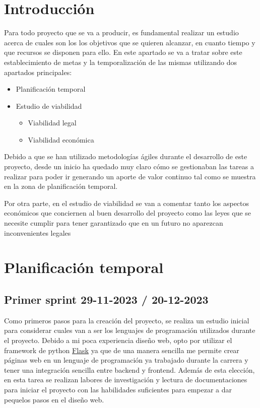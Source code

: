 
\section{Introducción}

Para todo proyecto que se va a producir, es fundamental realizar un estudio acerca de cuales son los los objetivos que se quieren alcanzar, en cuanto tiempo y que recursos se disponen para ello.
En este apartado se va a tratar sobre este establecimiento de metas y la temporalización de las mismas utilizando dos apartados principales:
\begin{itemize}
    \item Planificación temporal
    \item Estudio de viabilidad
    \begin{itemize}
        \item Viabilidad legal
        \item Viabilidad económica

    \end{itemize}

\end{itemize}


Debido a que se han utilizado metodologías ágiles durante el desarrollo de este proyecto, desde un inicio ha quedado muy claro cómo se gestionaban las tareas a realizar para poder ir generando un aporte de valor continuo tal como se muestra en la zona de planificación temporal.

Por otra parte, en el estudio de viabilidad se van a comentar tanto los aspectos económicos que conciernen al buen desarrollo del proyecto como las leyes que se necesite cumplir para tener garantizado que en un futuro no aparezcan inconvenientes legales

\section{Planificación temporal}


\subsection{Primer sprint 29-11-2023 / 20-12-2023}
Como primeros pasos para la creación del proyecto, se realiza un estudio inicial para considerar cuales van a ser los lenguajes de programación utilizados durante el proyecto. Debido a mi poca experiencia diseño web, opto por utilizar el framework de python \href{https://flask.palletsprojects.com/en/3.0.x/}{Flask} ya que de una manera sencilla me permite crear páginas web en un lenguaje de programación ya trabajado durante la carrera y tener una integración sencilla entre backend y frontend. Además de esta elección, en esta tarea se realizan labores de investigación y lectura de documentaciones para iniciar el proyecto con las habilidades suficientes para empezar a dar pequelos pasos en el diseño web.

